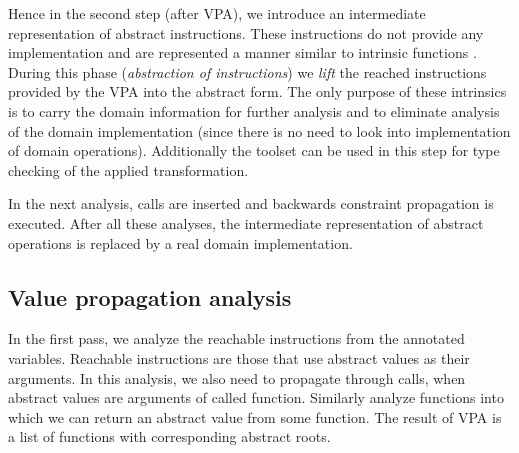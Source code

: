 Hence in the second step (after VPA), we introduce an intermediate representation of
abstract instructions. These instructions do not provide any implementation and
are represented a manner similar to \LLVM intrinsic functions
\cite{LLVM:langref}. During this phase (\emph{abstraction of instructions}) we
\emph{lift} the reached instructions provided by the VPA into the abstract form. The
only purpose of these intrinsics is to carry the domain information for further
analysis and to eliminate analysis of the domain implementation (since there is no need
to look into implementation of domain operations). Additionally the \LLVM
toolset can be used in this step for type checking of the applied transformation.

In the next analysis,  calls are inserted and backwards constraint
propagation is executed. After all these analyses, the intermediate
representation of abstract operations is replaced by a real domain
implementation.

\subsection{Value propagation analysis}
In the first \LLVM pass, we analyze the reachable instructions from the
annotated variables. Reachable instructions are those that use abstract values
as their arguments. In this analysis, we also need to propagate through calls,
when abstract values are arguments of called function. Similarly analyze
functions into which we can return an abstract value from some function. The
result of VPA is a list of functions with corresponding abstract roots.

